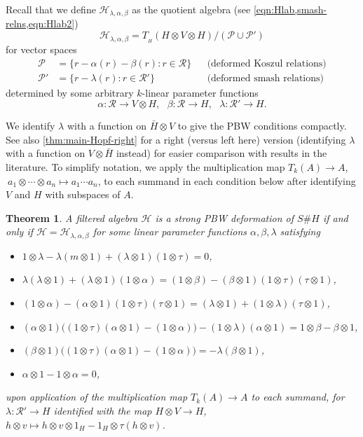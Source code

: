 \documentclass[11pt]{amsart}
\numberwithin{equation}{section}
\newtheorem{thm}[equation]{Theorem}
\newcommand{\chabl}{\cH_{\lambda,\alpha,\beta}}
\newcommand{\R}{\mathcal{R}}
\renewcommand{\P}{\mathcal{P}}
\renewcommand{\_}[1]{\mbox{$_{\left( #1 \right)}$}}
\newcommand{\ot}{\otimes}
\newcommand{\Ho}{H}%
\newcommand{\cH}{\mathcal{H}}
\begin{document}
{Recall that we define
$\chabl$ as the quotient algebra
(see \cref{eqn:Hlab,smash-relns,eqn:Hlab2}) 
\begin{equation}%
   \chabl = T_{\! _H}(\Ho\ot V \ot \Ho)/ (\P\cup \P')
\end{equation}
for vector spaces
$$
\begin{aligned}
  \P & =  \{ r -\alpha(r)-\beta(r) : r\in \R\} & & \text{(deformed
    Koszul relations)}\\
 \P' & =  \{ r - \lambda(r) : r\in \R' \} & & \text{(deformed smash relations)}
\end{aligned}
$$
determined by some arbitrary $k$-linear parameter functions 
\[
  \alpha: \R\rightarrow V\ot \Ho , \ \ \
   \beta: \R \rightarrow \Ho , \ \ \
   \lambda: \R'\rightarrow \Ho .
 \]



 We identify $\lambda$ with a function on $\bar H\ot V$ to give the
 PBW conditions compactly.
 See also \cref{thm:main-Hopf-right}
for a right (versus left here) version 
(identifying $\lambda$ with a function on $V\ot \bar H$ instead)
 for easier comparison
with results in the literature.
To simplify notation,
we apply the multiplication map $T_k(A)\rightarrow A$,
$\ a_1\ot\cdots\ot a_n\mapsto a_1\cdots  a_n$,
to each summand in each condition below after identifying $V$ and $H$ with
subspaces of $A$.

\vspace{1ex}

\begin{thm}    %
\label{thm:main-Hopf-left}
A filtered algebra $\cH$ is a strong PBW deformation of $S\# \Ho$ if
and only if $\cH= \chabl$ for some
linear parameter functions 
$\alpha,\beta,\lambda$ satisfying
\begin{itemize}
\item[$(1)$] $1\ot\lambda - \lambda (m\ot 1) + (\lambda\ot 1)(1\ot\tau) = 0$,
  \item[$(2)$] 
  $\lambda (\lambda\ot 1) + (\lambda\ot 1)(1\ot\alpha) 
    =     (1\ot\beta) - (\beta\ot 1)(1\ot \tau)(\tau\ot 1)$,
  \item[$(3)$] $(1\ot \alpha) - (\alpha\ot 1)(1\ot\tau)(\tau\ot 1)
  = (\lambda\ot 1)   + (1\ot\lambda)(\tau\ot 1)$,
       \item[$(4)$]
       $(\alpha\ot 1)\big((1\ot\tau)(\alpha\ot 1) - (1\ot \alpha)\big) 
       - (1\ot \lambda)(\alpha\ot 1) 
       = 1\ot\beta - \beta\ot 1$,
  \item[$(5)$] $(\beta\ot 1)\big((1\ot\tau)(\alpha\ot 1) - (1\ot\alpha)\big)
    = -\lambda (\beta\ot 1)$,
    \item[(6)] $\alpha\ot 1 - 1\ot\alpha =0$,
    \end{itemize}
    upon application of the multiplication map 
    $T_k(A)\rightarrow A$ to each summand,
    for $\lambda:\R'\rightarrow H$
identified with the map $H\ot V\rightarrow H$, 
$h\ot v \mapsto h\ot v \ot 1_H-1_H\ot \tau(h\ot v)$.
    

\end{thm}}
\end{document}
